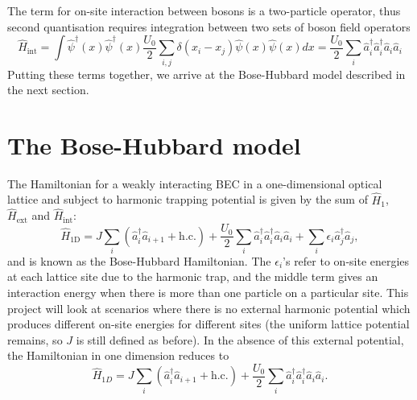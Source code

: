 \documentclass[a4paper, 10pt]{article}
\theoremstyle{plain}
\begin{document}
The term for on-site interaction between bosons is a two-particle operator, thus
second quantisation requires integration between two sets of boson field
operators
\begin{equation}
    \hat{H}_{\text{int}} =
    \int{\hat{\psi}^{\dagger}(x) \hat{\psi}^{\dagger}(x)
          \frac{U_{0}}{2} \sum_{i,j}{\delta(x_{i}-x_{j})}
          \hat{\psi}(x) \hat{\psi}(x) dx
        }
    =
    \frac{U_{0}}{2}
    \sum_{i}
        {\hat{a}_{i}^{\dagger} \hat{a}_{i}^{\dagger} \hat{a}_{i} \hat{a}_{i}}
\end{equation}
Putting these terms together, we arrive at the Bose-Hubbard model described in
the next section.


\section{The Bose-Hubbard model}

The Hamiltonian for a weakly interacting BEC in a one-dimensional optical
lattice and subject to harmonic trapping potential is given by the sum of
$\hat{H}_{1}$, $\hat{H}_{\text{ext}}$ and $\hat{H}_{\text{int}}$:
\begin{equation}
    \hat{H}_{\text{1D}}
    =
    J \sum_{i}{(\hat{a}^\dagger_{i}\hat{a}_{i+1} + \text{h.c.})} +
    \frac{U_{0}}{2}
    \sum_{i}%
        {\hat{a}_{i}^{\dagger} \hat{a}_{i}^{\dagger} \hat{a}_{i} \hat{a}_{i}} +
    \sum_{i}%
        {\epsilon_{i} \hat{a}_{j}^{\dagger} \hat{a}_{j}},
\end{equation}
and is known as the Bose-Hubbard Hamiltonian. The $\epsilon_{i}$'s refer to
on-site energies at each lattice site due to the harmonic trap, and the middle
term gives an interaction energy when there is more than one particle on a
particular site. This project will look at scenarios where there is no external
harmonic potential which produces different on-site energies for different sites
(the uniform lattice potential remains, so $J$ is still defined as before). In
the absence of this external potential, the Hamiltonian in one dimension reduces
to
\begin{equation*}
    \hat{H}_{1D}
    =
    J \sum_{i}{(\hat{a}^\dagger_{i}\hat{a}_{i+1} + \text{h.c.})} +
    \frac{U_{0}}{2}
    \sum_{i}{\hat{a}^\dagger_{i} \hat{a}^\dagger_{i} \hat{a}_{i}\hat{a}_{i}}.
\end{equation*}
\end{document}
